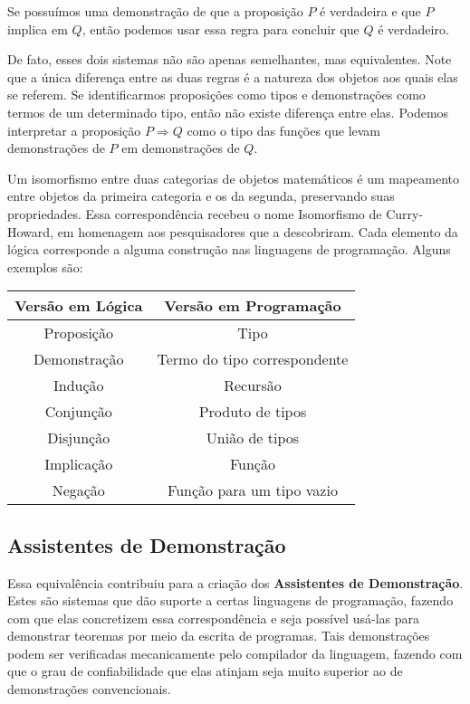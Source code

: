 \documentclass[12pt, oneside, a4paper,english,brazil]{abntex2}
\begin{document}
\qquad Se possuímos uma demonstração de que a proposição $P$ é verdadeira e que $P$
implica em $Q$, então podemos usar essa regra para concluir que $Q$ é verdadeiro.

\qquad De fato, esses dois sistemas não são apenas semelhantes, mas equivalentes. Note
que a única diferença entre as duas regras é a natureza dos objetos aos quais elas se referem.
Se identificarmos proposições como tipos e demonstrações como termos de um determinado
tipo, então não existe diferença entre elas. Podemos interpretar a proposição $P \Rightarrow Q$ como
o tipo das funções que levam demonstrações de $P$ em demonstrações de $Q$.

\qquad Um isomorfismo entre duas categorias de objetos matemáticos é um mapeamento
entre objetos da primeira categoria e os da segunda, preservando suas propriedades.
Essa correspondência recebeu o nome Isomorfismo de Curry-Howard, em homenagem
aos pesquisadores que a descobriram. Cada elemento da lógica corresponde a alguma
construção nas linguagens de programação. Alguns exemplos são:
\begin{table}[H]
  \centering
    \begin{tabular}{cc}\toprule
      Versão em Lógica & Versão em Programação  \\\midrule
      Proposição & Tipo \\
      Demonstração & Termo do tipo correspondente \\
      Indução & Recursão \\
      Conjunção & Produto de tipos \\
      Disjunção & União de tipos \\
      Implicação & Função \\
      Negação & Função para um tipo vazio \\\bottomrule
    \end{tabular}
\end{table}

\subsection*{Assistentes de Demonstra\c{c}\~ao}
\qquad Essa equivalência contribuiu para a cria\c{c}\~ao dos \textbf{Assistentes de Demonstra\c{c}\~ao}. Estes
são sistemas que dão suporte a certas linguagens de programação, fazendo com que elas
concretizem essa correspondência e seja possível usá-las para demonstrar teoremas por
meio da escrita de programas. Tais demonstrações podem ser verificadas mecanicamente
pelo compilador da linguagem, fazendo com que o grau de confiabilidade que elas atinjam
seja muito superior ao de demonstrações convencionais.
\end{document}

